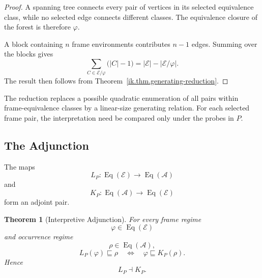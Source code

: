 \documentclass[11pt]{article}
\theoremstyle{plain}
\newtheorem{theorem}{Theorem}[section]
\theoremstyle{definition}
\theoremstyle{remark}
\begin{document}
\begin{proof}
  A spanning tree connects every pair of vertices
  in its selected equivalence class,
  while no selected edge connects different classes.
  The equivalence closure of the forest
  is therefore \(\varphi\).

  A block containing \(n\) frame environments
  contributes \(n-1\) edges.
  Summing over the blocks gives
  \[
    \sum_{C\in\mathcal{E}/\varphi}
    \bigl(
    |C|-1
    \bigr)
    =
    |\mathcal{E}|
    -
    |\mathcal{E}/\varphi|.
  \]
  The result then follows from
  Theorem~\ref{ik.thm.generating-reduction}.
\end{proof}

The reduction replaces a possible quadratic enumeration
of all pairs within frame-equivalence classes
by a linear-size generating relation.
For each selected frame pair,
the interpretation need be compared only under the probes in \(P\).

\subsection{The Adjunction}

The maps
\[
  L_P:
  \operatorname{Eq}(\mathcal{E})
  \longrightarrow
  \operatorname{Eq}(\mathcal{A})
\]
and
\[
  K_P:
  \operatorname{Eq}(\mathcal{A})
  \longrightarrow
  \operatorname{Eq}(\mathcal{E})
\]
form an adjoint pair.

\begin{theorem}[Interpretive Adjunction]
  \label{ik.thm.adjunction}
  For every frame regime
  \[
    \varphi
    \in
    \operatorname{Eq}(\mathcal{E})
  \]
  and occurrence regime
  \[
    \rho
    \in
    \operatorname{Eq}(\mathcal{A}),
  \]
  \[
    L_P(\varphi)
    \sqsubseteq
    \rho
    \quad\Longleftrightarrow\quad
    \varphi
    \sqsubseteq
    K_P(\rho).
  \]
  Hence
  \[
    L_P
    \dashv
    K_P.
  \]
\end{theorem}
\end{document}
